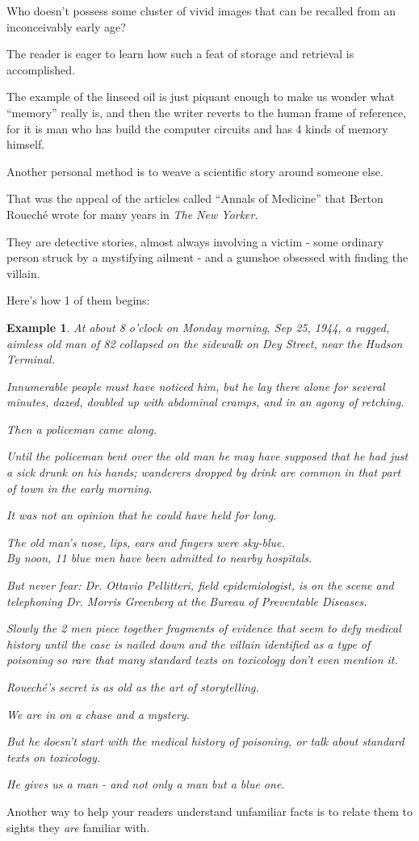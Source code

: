 \documentclass{book}
\numberwithin{equation}{section}
\newtheorem{example}{Example}[chapter]
\begin{document}
Who doesn't possess some cluster of vivid images that can be recalled from an inconceivably early age?

The reader is eager to learn how such a feat of storage and retrieval is accomplished.

The example of the linseed oil is just piquant enough to make us wonder what ``memory'' really is, and then the writer reverts to the human frame of reference, for it is man who has build the computer circuits and has 4 kinds of memory himself.

%
Another personal method is to weave a scientific story around someone else.

That was the appeal of the articles called ``Annals of Medicine'' that Berton Rouech\'e wrote for many years in \textit{The New Yorker}.

They are detective stories, almost always involving a victim - some ordinary person struck by a mystifying ailment - and a gumshoe obsessed with finding the villain.

Here's how 1 of them begins:
\begin{example}
    At about 8 o'clock on Monday morning, Sep 25, 1944, a ragged, aimless old man of 82 collapsed on the sidewalk on Dey Street, near the Hudson Terminal.
    
    Innumerable people must have noticed him, but he lay there alone for several minutes, dazed, doubled up with abdominal cramps, and in an agony of retching.
    
    Then a policeman came along.
    
    Until the policeman bent over the old man he may have supposed that he had just a sick drunk on his hands; wanderers dropped by drink are common in that part of town in the early morning.
    
    It was not an opinion that he could have held for long.
    
    The old man's nose, lips, ears and fingers were sky-blue.
    \\
    
    By noon, 11 blue men have been admitted to nearby hospitals.
    
    But never fear: Dr. Ottavio Pellitteri, field epidemiologist, is on the scene and telephoning Dr. Morris Greenberg at the Bureau of Preventable Diseases.
    
    Slowly the 2 men piece together fragments of evidence that seem to defy medical history until the case is nailed down and the villain identified as a type of poisoning so rare that many standard texts on toxicology don't even mention it.
    
    Rouech\'e's secret is as old as the art of storytelling.
    
    We are in on a chase and a mystery.
    
    But he doesn't start with the medical history of poisoning, or talk about standard texts on toxicology.
    
    He gives us a man - and not only a man but a blue one.
\end{example}
Another way to help your readers understand unfamiliar facts is to relate them to sights they \textit{are} familiar with.
\end{document}
